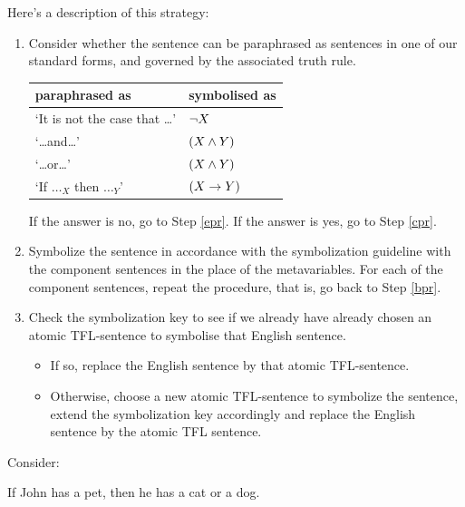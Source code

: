 Here's a description of this strategy:
\begin{highlighted}
	\begin{enumerate}
		\item\label{bpr} Consider whether the sentence can be paraphrased as sentences in one of our standard forms, and governed by the associated truth rule. 
		\begin{center}
			\begin{tabular}{l l}
				\textbf{paraphrased as} & \textbf{symbolised as}\\[.2em]
				\hline
				`It is not the case that \ldots' & $\neg X$\\
				`\ldots and\ldots' & $(X\mathbin{\wedge}Y)$\\
				`\ldots or\ldots' & $(X\mathbin{\wedge}Y)$\\
				`If $\ldots_X$ then $\ldots_Y$' & $(X\rightarrow Y)$
			\end{tabular}
		\end{center} 
		If the answer is no, go to Step \ref{epr}. If the answer is yes, go to Step \ref{cpr}.
		\item\label{cpr} Symbolize the sentence in accordance with the symbolization guideline with the component sentences in the place of the metavariables. For each of the component sentences, repeat the procedure, that is, go back to Step \ref{bpr}.
		\item\label{epr} Check the symbolization key to see if we already have already chosen an atomic TFL-sentence to symbolise that English sentence. 
		\begin{itemize}
			\item If so, replace the English sentence by that atomic TFL-sentence.
			\item Otherwise, choose a new atomic TFL-sentence to symbolize the sentence, extend the symbolization key accordingly and replace the English sentence by the atomic TFL sentence.
		\end{itemize}
	\end{enumerate}
\end{highlighted}


Consider:
\begin{samplesent}
	\item If John has a pet, then he has a cat or a dog. 
\end{samplesent}

